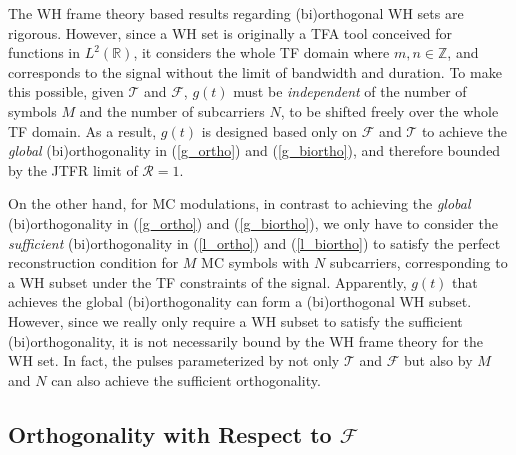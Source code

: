 \documentclass[journal]{IEEEtran}
\begin{document}
The WH frame theory based results regarding (bi)orthogonal WH sets are rigorous. However, since a WH set is originally a TFA tool conceived for functions in $L^2(\mathbb R)$, it considers the whole TF domain where $m,n\in \mathbb Z$, and corresponds to the signal without the limit of bandwidth and duration.
To make this possible, given $\mathcal T$ and $\mathcal F$, $g(t)$ must be \emph{independent} of the number of symbols $M$ and the number of subcarriers $N$, to be shifted freely over the whole TF domain. As a result, $g(t)$ is designed based only on $\mathcal F$ and $\mathcal T$ to achieve the \emph{global} (bi)orthogonality in (\ref{g_ortho}) and (\ref{g_biortho}), and therefore bounded by the JTFR limit of $\mathcal R=1$.

  {On the other hand, for MC {modulations}, in contrast to achieving the \emph{global} (bi)orthogonality in (\ref{g_ortho}) and (\ref{g_biortho}), we only have to consider the \emph{sufficient} (bi)orthogonality in (\ref{l_ortho}) and (\ref{l_biortho}) to satisfy the perfect reconstruction condition for $M$ MC symbols with $N$ subcarriers, corresponding to a WH subset under the {TF constraints of the signal}.
    Apparently, $g(t)$ that achieves the global (bi)orthogonality can form a (bi)orthogonal WH subset. However, since we really only require a WH subset to satisfy the sufficient (bi)orthogonality, it is not necessarily bound by the WH
    frame theory for the WH set. In fact, the pulses parameterized
    by not only $\mathcal T$ and $\mathcal F$ but also by $M$ and $N$ can also achieve the sufficient  orthogonality.}


\subsection{Orthogonality with Respect to $\mathcal F$}
\end{document}

